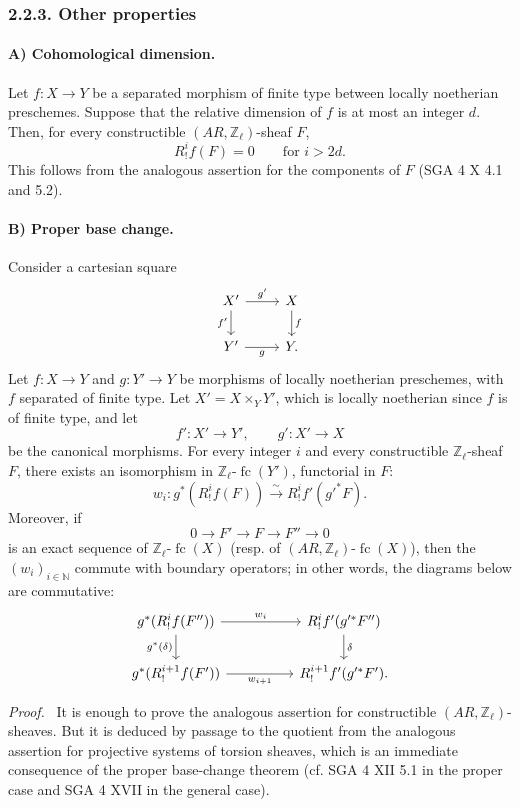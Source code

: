 \documentclass[11pt]{article}
\newenvironment{prooftext}[1][Proof]{\par\noindent\emph{#1.}\ }{\par\medskip}
\providecommand{\fc}{\operatorname{fc}}
\begin{document}
\subsubsection*{2.2.3. Other properties}\label{sga5:VI:subsubsection:2.2.3}

\paragraph{A) Cohomological dimension.}
Let \(f:X\to Y\) be a separated morphism of finite type between locally noetherian preschemes. Suppose that the relative dimension of \(f\) is at most an integer \(d\). Then, for every constructible \((AR,\mathbb Z_\ell)\)-sheaf \(F\),
\[
R^i_!f(F)=0\qquad\text{for }i>2d.
\]
This follows from the analogous assertion for the components of \(F\) (SGA 4 X 4.1 and 5.2).

\paragraph{B) Proper base change.}
Consider a cartesian square
\[
\begin{tikzcd}
X' \arrow[r,"g'"] \arrow[d,"f'"'] & X \arrow[d,"f"]\\
Y' \arrow[r,"g"'] & Y .
\end{tikzcd}
\]
Let \(f:X\to Y\) and \(g:Y'\to Y\) be morphisms of locally noetherian preschemes, with \(f\) separated of finite type. Let \(X'=X\times_Y Y'\), which is locally noetherian since \(f\) is of finite type, and let
\[
f':X'\to Y',\qquad g':X'\to X
\]
be the canonical morphisms. For every integer \(i\) and every constructible \(\mathbb Z_\ell\)-sheaf \(F\), there exists an isomorphism in \(\mathbb Z_\ell\text{-}\fc(Y')\), functorial in \(F\):
\[
w_i:g^*(R^i_!f(F))\xrightarrow{\sim} R^i_!f'(g'^*F).
\]
Moreover, if
\[
0\longrightarrow F'\longrightarrow F\longrightarrow F''\longrightarrow 0
\]
is an exact sequence of \(\mathbb Z_\ell\text{-}\fc(X)\) (resp. of \((AR,\mathbb Z_\ell)\text{-}\fc(X)\)), then the \((w_i)_{i\in\mathbb N}\) commute with boundary operators; in other words, the diagrams below are commutative:
\[
\begin{tikzcd}[column sep=huge]
g^*(R^i_!f(F'')) \arrow[r,"w_i"] \arrow[d,"g^*(\delta)"']
&
R^i_!f'(g'^*F'') \arrow[d,"\delta"]\\
g^*(R^{i+1}_!f(F')) \arrow[r,"w_{i+1}"']
&
R^{i+1}_!f'(g'^*F').
\end{tikzcd}
\]

\begin{prooftext}[Proof]
It is enough to prove the analogous assertion for constructible \((AR,\mathbb Z_\ell)\)-sheaves. But it is deduced by passage to the quotient from the analogous assertion for projective systems of torsion sheaves, which is an immediate consequence of the proper base-change theorem (cf. SGA 4 XII 5.1 in the proper case and SGA 4 XVII in the general case).
\end{prooftext}
\end{document}
